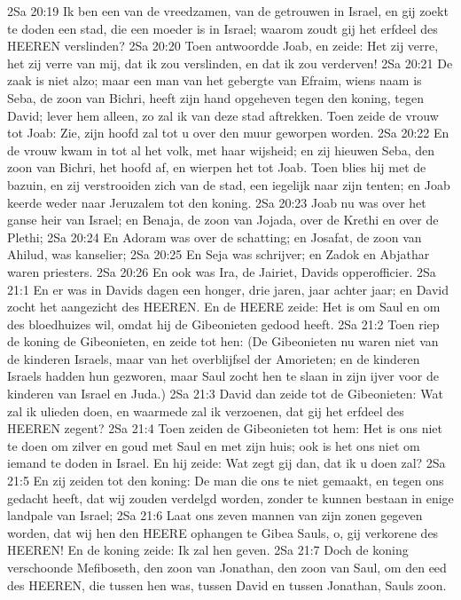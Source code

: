 2Sa 20:19  Ik ben een van de vreedzamen, van de getrouwen in Israel, en gij zoekt te doden een stad, die een moeder is in Israel; waarom zoudt gij het erfdeel des HEEREN verslinden?
2Sa 20:20  Toen antwoordde Joab, en zeide: Het zij verre, het zij verre van mij, dat ik zou verslinden, en dat ik zou verderven!
2Sa 20:21  De zaak is niet alzo; maar een man van het gebergte van Efraim, wiens naam is Seba, de zoon van Bichri, heeft zijn hand opgeheven tegen den koning, tegen David; lever hem alleen, zo zal ik van deze stad aftrekken. Toen zeide de vrouw tot Joab: Zie, zijn hoofd zal tot u over den muur geworpen worden.
2Sa 20:22  En de vrouw kwam in tot al het volk, met haar wijsheid; en zij hieuwen Seba, den zoon van Bichri, het hoofd af, en wierpen het tot Joab. Toen blies hij met de bazuin, en zij verstrooiden zich van de stad, een iegelijk naar zijn tenten; en Joab keerde weder naar Jeruzalem tot den koning.
2Sa 20:23  Joab nu was over het ganse heir van Israel; en Benaja, de zoon van Jojada, over de Krethi en over de Plethi;
2Sa 20:24  En Adoram was over de schatting; en Josafat, de zoon van Ahilud, was kanselier;
2Sa 20:25  En Seja was schrijver; en Zadok en Abjathar waren priesters.
2Sa 20:26  En ook was Ira, de Jairiet, Davids opperofficier.
2Sa 21:1  En er was in Davids dagen een honger, drie jaren, jaar achter jaar; en David zocht het aangezicht des HEEREN. En de HEERE zeide: Het is om Saul en om des bloedhuizes wil, omdat hij de Gibeonieten gedood heeft.
2Sa 21:2  Toen riep de koning de Gibeonieten, en zeide tot hen: (De Gibeonieten nu waren niet van de kinderen Israels, maar van het overblijfsel der Amorieten; en de kinderen Israels hadden hun gezworen, maar Saul zocht hen te slaan in zijn ijver voor de kinderen van Israel en Juda.)
2Sa 21:3  David dan zeide tot de Gibeonieten: Wat zal ik ulieden doen, en waarmede zal ik verzoenen, dat gij het erfdeel des HEEREN zegent?
2Sa 21:4  Toen zeiden de Gibeonieten tot hem: Het is ons niet te doen om zilver en goud met Saul en met zijn huis; ook is het ons niet om iemand te doden in Israel. En hij zeide: Wat zegt gij dan, dat ik u doen zal?
2Sa 21:5  En zij zeiden tot den koning: De man die ons te niet gemaakt, en tegen ons gedacht heeft, dat wij zouden verdelgd worden, zonder te kunnen bestaan in enige landpale van Israel;
2Sa 21:6  Laat ons zeven mannen van zijn zonen gegeven worden, dat wij hen den HEERE ophangen te Gibea Sauls, o, gij verkorene des HEEREN! En de koning zeide: Ik zal hen geven.
2Sa 21:7  Doch de koning verschoonde Mefiboseth, den zoon van Jonathan, den zoon van Saul, om den eed des HEEREN, die tussen hen was, tussen David en tussen Jonathan, Sauls zoon.
